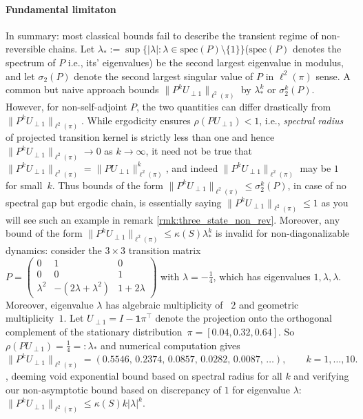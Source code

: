 \documentclass[preprint]{imsart}
\theoremstyle{plain}
\theoremstyle{definition}
\begin{document}
\paragraph{Fundamental limitaton}
In summary: most classical bounds fail to describe the transient regime of non-reversible chains.
Let $\lambda_{*} := \sup\{|\lambda| : \lambda \in \mathrm{spec}(P)\setminus\{1\}\}$($\mathrm{spec}(P)$ denotes the spectrum of $P$ i.e., its' eigenvalues) 
be the second largest eigenvalue in modulus, and let $\sigma_{2}(P)$ 
denote the second largest singular value of $P$ in $\ell^{2}(\pi)$ sense.
A common but naive approach bounds $\|P^{k}U_{\perp 1}\|_{\ell^{2}(\pi)}$
by $\lambda_{*}^{k}$ or $\sigma_{2}^{k}(P)$.
However, for non-self-adjoint $P$, the two quantities can differ drastically from $\|P^{k}U_{\perp 1}\|_{\ell^{2}(\pi)}$.
While ergodicity ensures $\rho(PU_{\perp 1})<1$, i.e., \emph{spectral radius} of projected transition kernel is strictly less than one and hence
$\|P^{k}U_{\perp 1}\|_{\ell^{2}(\pi)} \to 0$ as $k \to \infty$,
it need not be true that
$\|P^{k}U_{\perp 1}\|_{\ell^{2}(\pi)} = \|PU_{\perp 1}\|_{\ell^{2}(\pi)}^{k}$,
and indeed $\|P^{k}U_{\perp 1}\|_{\ell^{2}(\pi)}$ may be $1$ for small~$k$.
Thus bounds of the form $\|P^{k}U_{\perp 1}\|_{\ell^{2}(\pi)} \leq \sigma_{2}^{k}(P)$, in case of no spectral gap but ergodic chain, is essentially saying $\|P^{k}U_{\perp 1}\|_{\ell^{2}(\pi)}\leq 1$ as you will see such an example in remark \ref{rmk:three_state_non_rev}. Moreover, any bound of the form $\|P^{k}U_{\perp 1}\|_{\ell^{2}(\pi)} \leq  \kappa(S)\lambda_{*}^{k}$ is invalid for non-diagonalizable dynamics: consider the $3\times3$ transition matrix 
\( 
P=\begin{pmatrix}
0 & 1 & 0\\
0 & 0 & 1\\
\lambda^{2} & -(2\lambda+\lambda^{2}) & 1+2\lambda
\end{pmatrix}
\)
with $\lambda=-\tfrac14$, which has eigenvalues $1,\lambda,\lambda$. Moreover, eigenvalue $\lambda$ has algebraic multiplicity of ~$2$ and geometric multiplicity~$1$.  
Let $U_{\perp1}=I-\mathbf{1}\pi^{\top}$ denote the projection onto the orthogonal complement of the stationary distribution~$\pi=[0.04,0.32,0.64]$. So $\rho(PU_{\perp 1})=\frac{1}{4}=:\lambda_{*}$ and numerical computation gives $\|P^{k}U_{\perp1}\|_{\ell^{2}(\pi)}=
(0.5546,\,0.2374,\,0.0857,\,0.0282,\,0.0087,\,\dots),
\qquad k=1,\ldots,10.
$, deeming void exponential bound based on spectral radius for all $k$ and verifying our non-asymptotic bound based on discrepancy of $1$ for eigenvalue $\lambda$: $\|P^{k}U_{\perp 1}\|_{\ell^{2}(\pi)}\leq \kappa(S)k|\lambda|^{k}.$   
\end{document}
